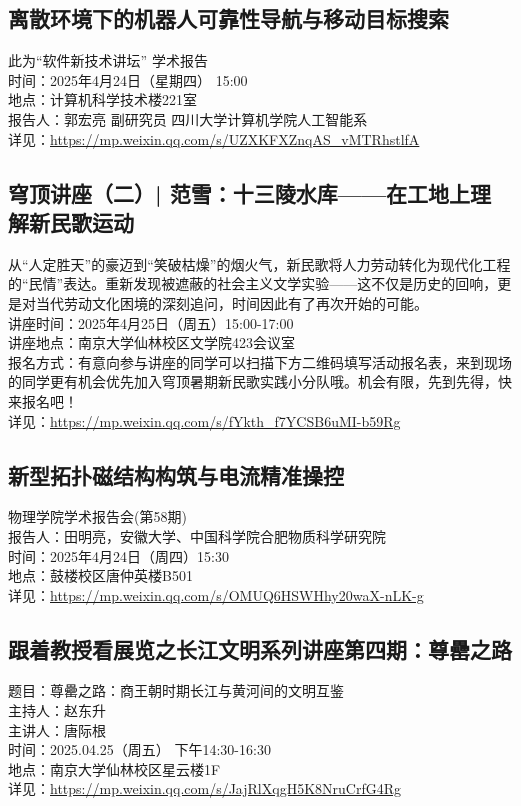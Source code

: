 \documentclass[letterpaper, 12pt]{article}
\begin{document}
\begin{multicols}{2}
\begin{tabular}{|>{\centering\arraybackslash}m{}|m{}|m{}|}
\end{tabular}
\subsection{离散环境下的机器人可靠性导航与移动目标搜索} %
此为“软件新技术讲坛” 学术报告
\\时间：2025年4月24日（星期四） 15:00
\\地点：计算机科学技术楼221室
\\报告人：郭宏亮 副研究员 四川大学计算机学院人工智能系
\\详见：\url{https://mp.weixin.qq.com/s/UZXKFXZnqAS_vMTRhstlfA}

\subsection{穹顶讲座（二）| 范雪：十三陵水库——在工地上理解新民歌运动} %
从“人定胜天”的豪迈到“笑破枯燥”的烟火气，新民歌将人力劳动转化为现代化工程的“民情”表达。重新发现被遮蔽的社会主义文学实验——这不仅是历史的回响，更是对当代劳动文化困境的深刻追问，时间因此有了再次开始的可能。
\\讲座时间：2025年4月25日（周五）15:00-17:00
\\讲座地点：南京大学仙林校区文学院423会议室
\\报名方式：有意向参与讲座的同学可以扫描下方二维码填写活动报名表，来到现场的同学更有机会优先加入穹顶暑期新民歌实践小分队哦。机会有限，先到先得，快来报名吧！
\\详见：\url{https://mp.weixin.qq.com/s/fYkth_f7YCSB6uMI-b59Rg}

\subsection{新型拓扑磁结构构筑与电流精准操控} %
物理学院学术报告会(第58期)
\\报告人：田明亮，安徽大学、中国科学院合肥物质科学研究院
\\时间：2025年4月24日（周四）15:30
\\地点：鼓楼校区唐仲英楼B501
\\详见：\url{https://mp.weixin.qq.com/s/OMUQ6HSWHhy20waX-nLK-g}

\subsection{跟着教授看展览之长江文明系列讲座第四期：尊罍之路} %
题目：尊罍之路：商王朝时期长江与黄河间的文明互鉴
\\主持人：赵东升
\\主讲人：唐际根
\\时间：2025.04.25（周五） 下午14:30-16:30
\\地点：南京大学仙林校区星云楼1F
\\详见：\url{https://mp.weixin.qq.com/s/JajRlXqgH5K8NruCrfG4Rg}


\end{multicols}
\end{document}

